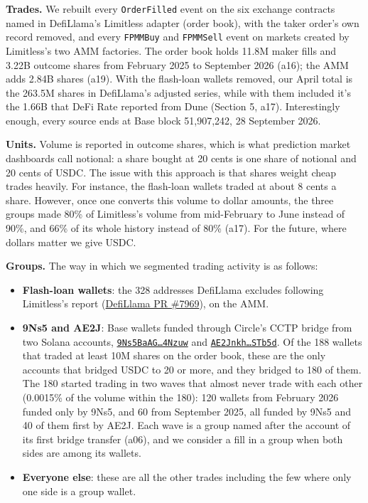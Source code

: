 \documentclass[11pt]{article}
\begin{document}
\textbf{Trades.} We rebuilt every \texttt{OrderFilled} event on the six exchange contracts named in DefiLlama's Limitless adapter (order book), with the taker order's own record removed, and every \texttt{FPMMBuy} and \texttt{FPMMSell} event on markets created by Limitless's two AMM factories.
The order book holds 11.8M maker fills and 3.22B outcome shares from February 2025 to September 2026 (a16); the AMM adds 2.84B shares (a19).
With the flash-loan wallets removed, our April total is the 263.5M shares in DefiLlama's adjusted series, while with them included it's the 1.66B that DeFi Rate reported from Dune (Section 5, a17).
Interestingly enough, every source ends at Base block 51,907,242, 28 September 2026.

\textbf{Units.} Volume is reported in outcome shares, which is what prediction market dashboards call notional: a share bought at 20 cents is one share of notional and 20 cents of USDC.
The issue with this approach is that shares weight cheap trades heavily.
For instance, the flash-loan wallets traded at about 8 cents a share.
However, once one converts this volume to dollar amounts, the three groups made 80\% of Limitless's volume from mid-February to June instead of 90\%, and 66\% of its whole history instead of 80\% (a17).
For the future, where dollars matter we give USDC.

\textbf{Groups.} The way in which we segmented trading activity is as follows:

\begin{itemize}
\item \textbf{Flash-loan wallets}: the 328 addresses DefiLlama excludes following Limitless's report (\href{https://github.com/DefiLlama/dimension-adapters/pull/7969}{DefiLlama PR \#7969}), on the AMM.
\item \textbf{9Ns5 and AE2J}: Base wallets funded through Circle's CCTP bridge from two Solana accounts, \href{https://solscan.io/account/9Ns5BaAG2oWJB2C1PgEpHeC3rBXLqJEmZKt7TQi4Nzuw}{\texttt{9Ns5BaAG\ldots 4Nzuw}} and \href{https://solscan.io/account/AE2JnkhVsi6Zu1pHCMah2JYjeugCEBiNYDn11q2STb5d}{\texttt{AE2Jnkh\ldots STb5d}}.
Of the 188 wallets that traded at least 10M shares on the order book, these are the only accounts that bridged USDC to 20 or more, and they bridged to 180 of them.
The 180 started trading in two waves that almost never trade with each other (0.0015\% of the volume within the 180): 120 wallets from February 2026 funded only by 9Ns5, and 60 from September 2025, all funded by 9Ns5 and 40 of them first by AE2J.
Each wave is a group named after the account of its first bridge transfer (a06), and we consider a fill in a group when both sides are among its wallets.
\item \textbf{Everyone else}: these are all the other trades including the few where only one side is a group wallet.
\end{itemize}
\end{document}
